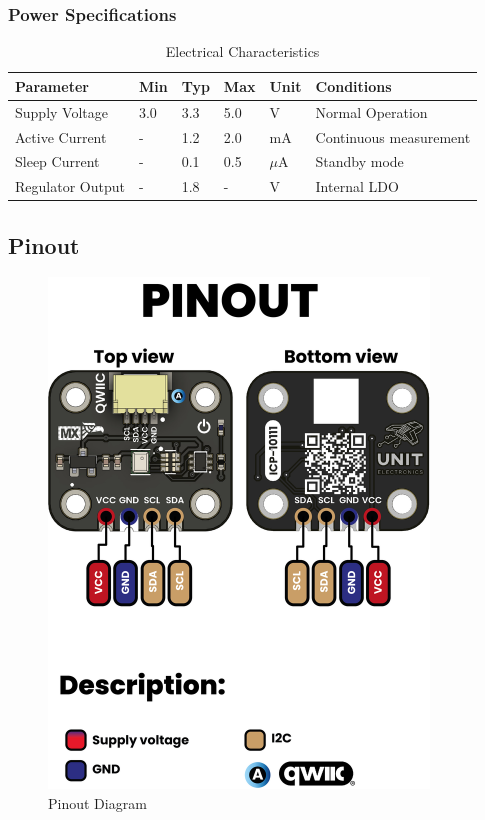 \documentclass[11pt,a4paper]{article}
\begin{document}
\subsubsection{Power Specifications}


\begin{table}[H]
\centering
\small
\begin{tabular}{|l|l|l|l|l|l|}
\hline
Parameter & Min & Typ & Max & Unit & Conditions \\
\hline
Supply Voltage & 3.0 & 3.3 & 5.0 & V & Normal Operation \\
Active Current & - & 1.2 & 2.0 & mA & Continuous measurement \\
Sleep Current & - & 0.1 & 0.5 & $\mu$A & Standby mode \\
Regulator Output & - & 1.8 & - & V & Internal LDO \\
\hline
\end{tabular}
\caption{Electrical Characteristics}
\end{table}


\subsection{Pinout}


\begin{figure}[H]
\centering
\includegraphics[width=0.9\textwidth]{en_unit_pinout_v_0_0_1_ue0094_icp10111_barometric_pressure_sensor_en.jpg}
\caption{Pinout Diagram}
\label{fig:en-unit-pinout-v-0-0-1-ue0094-icp10111-barometric-pressure-sensor-en-jpg}
\end{figure}
\end{document}
